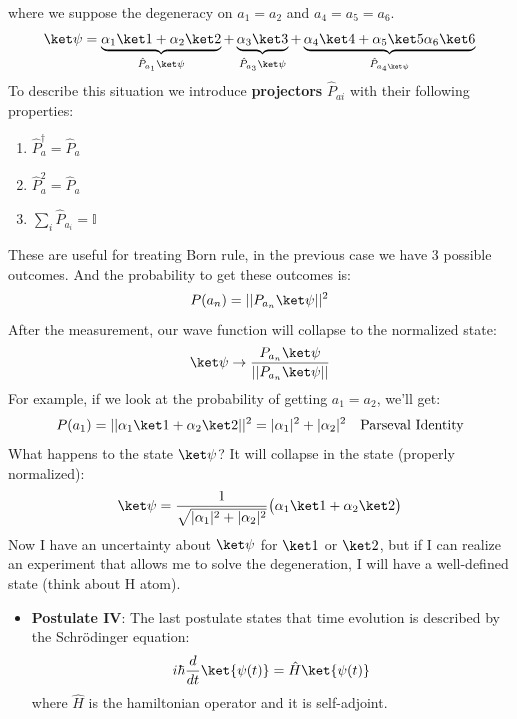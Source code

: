 \noindent where we suppose the degeneracy on $a_1=a_2$ and $a_4=a_5=a_6$. 
\begin{equation*}
    \ket \psi = \underbrace{\alpha_1\ket1+\alpha_2\ket2}_{\hat P_{a_1}\ket\psi}+\underbrace{\alpha_3\ket3}_{\hat P_{a_3}\ket\psi}+\underbrace{\alpha_4\ket4+\alpha_5\ket5\alpha_6\ket6}_{\hat P_{a_4\ket \psi}}
\end{equation*}
\noindent To describe this situation we introduce \textbf{projectors} $\hat P_{ai}$ with their following properties:
\begin{enumerate}
    \item $\hat P_a^\dagger=\hat P_a$
    \item $\hat P_a^2=\hat P_a$
    \item $\sum_i \hat P_{a_i}=\mathbb{I}$
\end{enumerate}
\noindent These are useful for treating Born rule, in the previous case we have 3 possible outcomes. And the probability to get these outcomes is:
\begin{equation*}
    P(a_n)=||P_{a_n}\ket \psi||^2
\end{equation*}
\noindent After the measurement, our wave function will collapse to the normalized state:
\begin{equation*}
    \ket \psi \rightarrow \frac{P_{a_n}\ket\psi}{||P_{a_n}\ket \psi||}
\end{equation*}
\noindent For example, if we look at the probability of getting $a_1=a_2$, we'll get:
\begin{equation*}
    P(a_1)=||\alpha_1\ket1+\alpha_2\ket2||^2=|\alpha_1|^2+|\alpha_2|^2 \ \ \ \text{Parseval Identity}
\end{equation*}
\noindent What happens to the state $\ket \psi$? It will collapse in the state (properly normalized):
\begin{equation*}
    \ket \psi=\frac{1}{\sqrt{|\alpha_1|^2+|\alpha_2|^2}}\big(\alpha_1\ket1+\alpha_2\ket2\big)
\end{equation*}
\noindent Now I have an uncertainty about $\ket\psi$ for $\ket1$ or $\ket2$, but if I can realize an experiment that allows me to solve the degeneration, I will have a well-defined state (think about H atom).
\begin{itemize}
    \item \textbf{Postulate IV}: The last postulate states that time evolution is described by the Schrödinger equation:
    \begin{equation*}
        i\hbar\frac{d}{dt}\ket{\psi(t)}=\hat H \ket{\psi(t)}
    \end{equation*}
    where $\hat H$ is the hamiltonian operator and it is self-adjoint.
\end{itemize}
